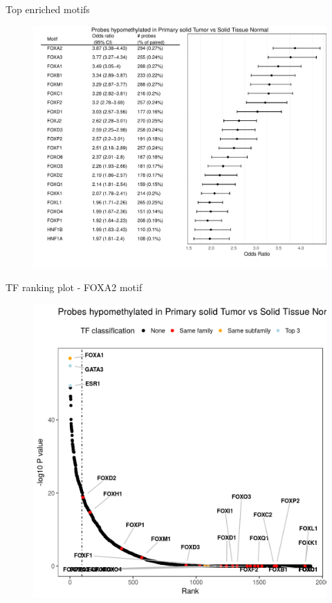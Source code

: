 \documentclass[slidestop,compress,11pt,xcolor=dvipsnames]{beamer}
\begin{document}
\begin{frame}{Top enriched motifs}
 \vspace*{-0.3cm}
 \begin{figure}
  \centering
  \includegraphics[width=0.9\linewidth]{ELMER/BRCA_unsupervise_OR_table.pdf}
 \end{figure}
\end{frame}


\begin{frame}{TF ranking plot - FOXA2 motif}
 \vspace*{-0.3cm}
 \begin{figure}
  \centering
  \includegraphics[width=0.7\linewidth]{ELMER/BRCA_TF_rank.png}
 \end{figure}
\end{frame}
\end{document}
